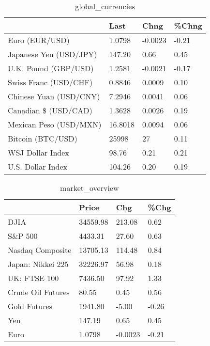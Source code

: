 \documentclass{article}%
\begin{document}
%


\begin{table}[htbp]%
\caption{global\_currencies}%
\centering%
\begin{adjustbox}{width=1\textwidth}%
\begin{tabular}{llll}
\toprule
                       &    Last &    Chng & \%Chng \\
\midrule
        Euro (EUR/USD) &  1.0798 & -0.0023 & -0.21 \\
Japanese Yen (USD/JPY) &  147.20 &    0.66 &  0.45 \\
  U.K. Pound (GBP/USD) &  1.2581 & -0.0021 & -0.17 \\
 Swiss Franc (USD/CHF) &  0.8846 &  0.0009 &  0.10 \\
Chinese Yuan (USD/CNY) &  7.2946 &  0.0041 &  0.06 \\
  Canadian \$ (USD/CAD) &  1.3628 &  0.0026 &  0.19 \\
Mexican Peso (USD/MXN) & 16.8018 &  0.0094 &  0.06 \\
     Bitcoin (BTC/USD) &   25998 &      27 &  0.11 \\
      WSJ Dollar Index &   98.76 &    0.21 &  0.21 \\
     U.S. Dollar Index &  104.26 &    0.20 &  0.19 \\
\bottomrule
\end{tabular}
%
\end{adjustbox}%
\end{table}

%


\begin{table}[htbp]%
\caption{market\_overview}%
\centering%
\begin{adjustbox}{width=1\textwidth}%
\begin{tabular}{llll}
\toprule
                  &    Price &     Chg &  \%Chg \\
\midrule
             DJIA & 34559.98 &  213.08 &  0.62 \\
          S\&P 500 &  4433.31 &   27.60 &  0.63 \\
 Nasdaq Composite & 13705.13 &  114.48 &  0.84 \\
Japan: Nikkei 225 & 32226.97 &   56.98 &  0.18 \\
     UK: FTSE 100 &  7436.50 &   97.92 &  1.33 \\
Crude Oil Futures &    80.55 &    0.45 &  0.56 \\
     Gold Futures &  1941.80 &   -5.00 & -0.26 \\
              Yen &   147.19 &    0.65 &  0.45 \\
             Euro &   1.0798 & -0.0023 & -0.21 \\
\bottomrule
\end{tabular}
%
\end{adjustbox}%
\end{table}

%
\end{document}
